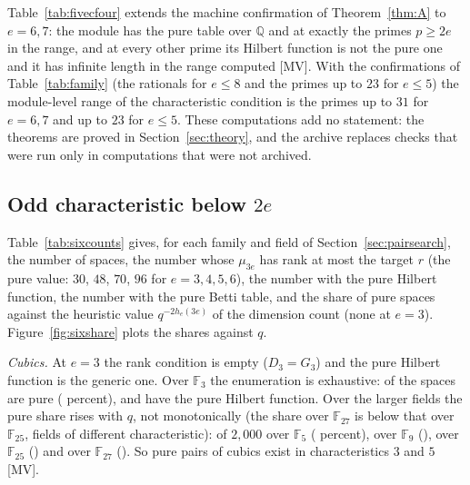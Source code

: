 \documentclass[11pt]{article}
\theoremstyle{definition}
\theoremstyle{remark}
\newcommand{\Q}{\mathbb{Q}}
\newcommand{\F}{\mathbb{F}}
\begin{document}
Table~\ref{tab:fivecfour} extends the machine confirmation of Theorem~\ref{thm:A} to $e=6,7$: the module has the pure table over $\Q$ and at exactly the primes $p\ge2e$ in the range, and at every other prime its Hilbert function is not the pure one and it has infinite length in the range computed [MV]. With the confirmations of Table~\ref{tab:family} (the rationals for $e\le8$ and the primes up to $23$ for $e\le5$) the module-level range of the characteristic condition is the primes up to $31$ for $e=6,7$ and up to $23$ for $e\le5$. These computations add no statement: the theorems are proved in Section~\ref{sec:theory}, and the archive replaces checks that were run only in computations that were not archived.

\subsection{Odd characteristic below \texorpdfstring{$2e$}{2e}}
\label{sec:resodd}

Table~\ref{tab:sixcounts} gives, for each family and field of Section~\ref{sec:pairsearch}, the number of spaces, the number whose $\mu_{3e}$ has rank at most the target $r$ (the pure value: $30$, $48$, $70$, $96$ for $e=3,4,5,6$), the number with the pure Hilbert function, the number with the pure Betti table, and the share of pure spaces against the heuristic value $q^{-2h_e(3e)}$ of the dimension count (none at $e=3$). Figure~\ref{fig:sixshare} plots the shares against $q$.

\begin{table}[htbp]
\centering\footnotesize

\caption{Pure pairs of forms over small fields: for each family the degree $e$, the field, the number of spaces (all subspaces over $\F_3$ at $e=3$, random draws otherwise), the number with $\operatorname{rank}\mu_{3e}\le r$ (with its share), with the pure Hilbert function, with the pure Betti table, the share of pure spaces, the heuristic value $q^{-2h_e(3e)}$ of the dimension count ($q^{-(\dim G_e-(4e-4))}$; none at $e=3$, where the pure set is open in $G_3$) and their ratio; the rows marked $^\dagger$ are families stopped after $\neightEarlyStop$ pure spaces, with the number of spaces done.}
\label{tab:sixcounts}
\end{table}

\emph{Cubics.} At $e=3$ the rank condition is empty ($D_3=G_3$) and the pure Hilbert function is the generic one. Over $\F_3$ the enumeration is exhaustive: \nsixAOneThreePure{} of the \nsixAOneThreeSpaces{} spaces are pure (\nsixAOneThreeSharePure{} percent), and \nsixAOneThreePureHF{} have the pure Hilbert function. Over the larger fields the pure share rises with $q$, not monotonically (the share over $\F_{27}$ is below that over $\F_{25}$, fields of different characteristic): \nsixATwoFivePure{} of $2{,}000$ over $\F_5$ (\nsixATwoFiveSharePure{} percent), \nsixATwoNinePure{} over $\F_9$ (\nsixATwoNineSharePure{}), \nsixATwoTwentyFivePure{} over $\F_{25}$ (\nsixATwoTwentyFiveSharePure{}) and \nsixATwoTwentySevenPure{} over $\F_{27}$ (\nsixATwoTwentySevenSharePure{}). So pure pairs of cubics exist in characteristics $3$ and $5$ [MV].
\end{document}
